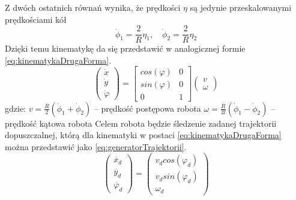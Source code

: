         Z dwóch ostatnich równań wynika, że prędkości $\eta$ są jedynie przeskalowanymi prędkościami kół
        \begin{equation*}
            \dot{\phi}_1 = \frac{2}{R}\eta_1, \quad \dot{\phi}_2 = \frac{2}{R}\eta_2
        \end{equation*}
        Dzięki temu kinematykę da się przedstawić w analogicznej formie \ref{eq:kinematykaDrugaForma}.
        \begin{equation}
            \left(\begin{array}{c}
                \dot{x} \\
                \dot{y} \\
                \dot{\varphi}
            \end{array}\right)
            =
             \begin{bmatrix}
                cos(\varphi) & 0 \\
                sin(\varphi) & 0 \\
                0 & 1
            \end{bmatrix}
            \left(\begin{array}{c}
                v \\
                \omega
            \end{array}\right)
            \label{eq:kinematykaDrugaForma}
        \end{equation}
        gdzie: \newline
        $v = \frac{R}{2}(\dot{\phi}_1+\dot{\phi}_2)$ -- prędkość postępowa robota \newline
        $\omega = \frac{R}{2l}(\dot{\phi}_1-\dot{\phi}_2)$ -- prędkość kątowa robota \newline
        Celem robota będzie śledzenie zadanej trajektorii dopuszczalnej, którą dla kinematyki w postaci \ref{eq:kinematykaDrugaForma} można przedstawić jako \ref{eq:generatorTrajektorii}.
        \begin{equation}
            \left(\begin{array}{c}
                \dot{x_d} \\
                \dot{y_d} \\
                \dot{\varphi_d}
            \end{array}\right)
            =
            \left(\begin{array}{c}
                v_{d}cos(\varphi_{d}) \\
                v_{d}sin(\varphi_{d}) \\
                \omega_{d}
            \end{array}\right)
            \label{eq:generatorTrajektorii}
        \end{equation}

